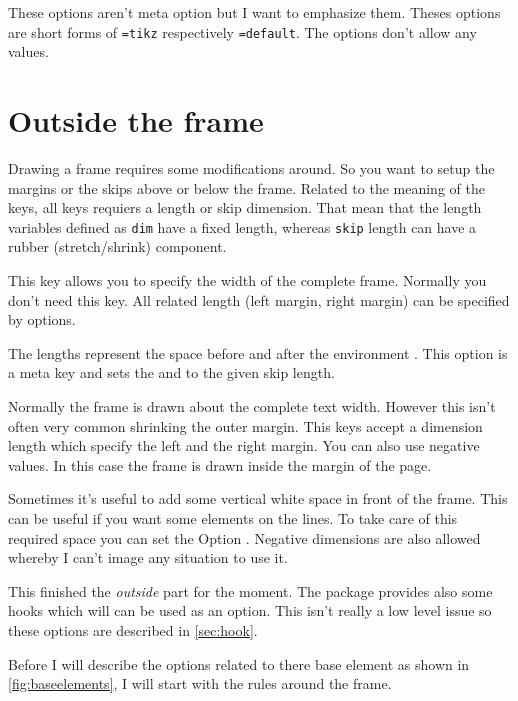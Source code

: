 \documentclass[openany,12pt,tocdepth=3]{ltx-md}
\begin{document}
These options aren't meta option but I want to emphasize them. Theses options are 
short forms of \texttt{=tikz} respectively \texttt{=default}.
The options don't allow any values.


\section{Outside the frame}
Drawing a frame requires some modifications around. So you want to setup the margins
or the skips above or below the frame. Related to the meaning of the keys, all keys 
requiers a length or skip dimension. That mean that the length variables defined as
\texttt{dim} have a fixed length, whereas \texttt{skip} length can have a rubber (stretch/shrink) component. 

\ExplOpt[\string\linewidth]{width}
This key allows you to specify the width of the complete frame. 
Normally you don't need this key. All related length (left margin, right margin)
can be specified by options. 


The lengths represent the space before and after the environment .  
This option  is a meta key and sets the  and  to the given skip length. 


Normally the frame  is drawn about the complete text width. However this isn't
often very common shrinking the outer margin. This keys accept a dimension length 
which specify the left and the right margin. You can also use negative values. In this case the frame 
is drawn inside the margin of the page.


Sometimes it's useful to add some vertical white space in front of the frame. This can be useful
if you want some elements on the lines. To take care of this required space you can
set the Option . Negative dimensions are also allowed whereby I can't
image any situation to use it. 



\vspace*{\baselineskip}
This finished the \emph{outside} part for the moment. The package provides also some hooks
which will can be used as an option. This isn't really a low level issue so these
options are described in \autoref{sec:hook}. 

\vspace*{\baselineskip}
Before I will describe the options related to there base element as shown in \autoref{fig:baseelements}, 
I will start with the rules around the frame.
\end{document}
